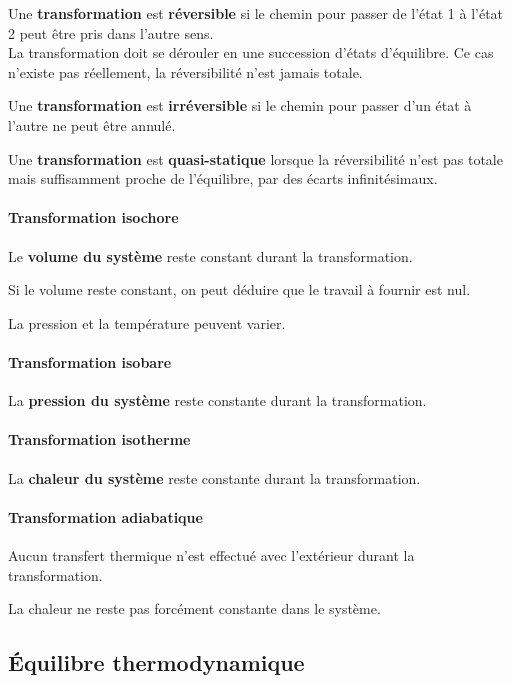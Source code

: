 \documentclass[]{article}
\let\oldparagraph\paragraph
\renewcommand{\paragraph}[1]{\oldparagraph{#1}\mbox{}}
\begin{document}
Une \textbf{transformation} est \textbf{réversible} si le chemin pour
passer de l’état 1 à l’état 2 peut être pris dans l’autre sens. \\
La transformation doit se dérouler en une succession d’états d’équilibre.
Ce cas n’existe pas réellement, la réversibilité n’est jamais totale.

Une \textbf{transformation} est \textbf{irréversible} si le chemin pour
passer d’un état à l’autre ne peut être annulé.

Une \textbf{transformation} est \textbf{quasi-statique} lorsque la
réversibilité n’est pas totale mais suffisamment proche de l’équilibre,
par des écarts infinitésimaux.

\paragraph{Transformation isochore}\label{transformation-isochore}

Le \textbf{volume du système} reste constant durant la transformation.

Si le volume reste constant, on peut déduire que le travail à fournir
est nul.

La pression et la température peuvent varier.

\paragraph{Transformation isobare}\label{transformation-isobare}

La \textbf{pression du système} reste constante durant la
transformation.

\paragraph{Transformation isotherme}\label{transformation-isotherme}

La \textbf{chaleur du système} reste constante durant la transformation.

\paragraph{Transformation adiabatique}\label{transformation-adiabatique}

Aucun transfert thermique n’est effectué avec l’extérieur durant la transformation.

La chaleur ne reste pas forcément constante dans le système.

\subsection{Équilibre thermodynamique}\label{equilibre-thermodynamique}
\end{document}
